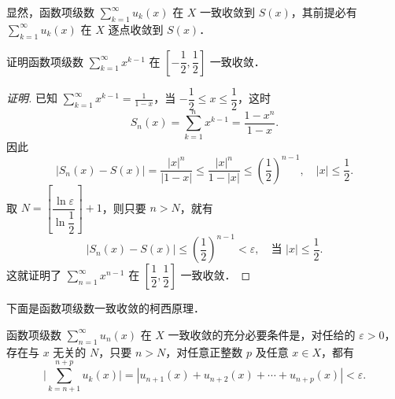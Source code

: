 显然，函数项级数 $\displaystyle\sum_{k=1}^{\infty}u_{k}(x)$ 在 $X$ 一致收敛到 $S(x)$，其前提必有 $\displaystyle\sum_{k=1}^{\infty}u_{k}(x)$ 在 $X$ 逐点收敛到 $S(x)$．

\begin{example}\label{ex:12-2-4}
证明函数项级数 $\displaystyle\sum_{k=1}^{\infty}x^{k-1}$ 在 $\left[-\dfrac{1}{2},\dfrac{1}{2}\right]$ 一致收敛．
\end{example}

\begin{proof}[证明]
已知 $\displaystyle\sum_{k=1}^{\infty}x^{k-1}=\frac{1}{1-x}$，当 $-\dfrac{1}{2}\leqslant x\leqslant\dfrac{1}{2}$，这时
\[
S_{n}(x)=\sum_{k=1}^{n}x^{k-1}=\frac{1-x^{n}}{1-x}.
\]
因此
\[
\left|S_{n}(x)-S(x)\right|=\frac{|x|^{n}}{|1-x|}\leqslant\frac{|x|^{n}}{1-|x|}\leqslant\left(\frac{1}{2}\right)^{n-1},\quad|x|\leqslant\frac{1}{2}.
\]
取 $N=\left[\dfrac{\ln\varepsilon}{\ln\dfrac{1}{2}}\right]+1$，则只要 $n>N$，就有
\[
\left|S_{n}(x)-S(x)\right|\leqslant\left(\frac{1}{2}\right)^{n-1}<\varepsilon,\quad\text{当 }|x|\leqslant\frac{1}{2}.
\]
这就证明了 $\displaystyle\sum_{n=1}^{\infty}x^{n-1}$ 在 $\left[\dfrac{1}{2},\dfrac{1}{2}\right]$ 一致收敛．
\end{proof}

下面是函数项级数一致收敛的柯西原理．

\begin{theorem}[柯西原理]\label{thm:12-4}
函数项级数 $\displaystyle\sum_{n=1}^{\infty}u_{n}(x)$ 在 $X$ 一致收敛的充分必要条件是，对任给的 $\varepsilon>0$，存在与 $x$ 无关的 $N$，只要 $n>N$，对任意正整数 $p$ 及任意 $x\in X$，都有
\[
\Big|\sum_{k=n+1}^{n+p}u_{k}(x)\Big|=\left|u_{n+1}(x)+u_{n+2}(x)+\cdots+u_{n+p}(x)\right|<\varepsilon.
\]
\end{theorem}

